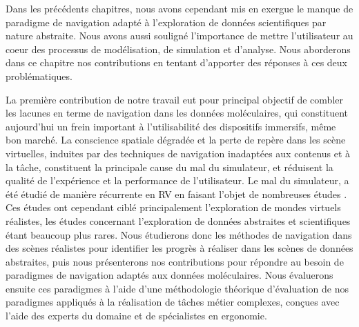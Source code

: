 
Dans les précédents chapitres, nous avons cependant mis en exergue le manque de paradigme de navigation adapté à l'exploration de données scientifiques par nature abstraite. Nous avons aussi souligné l'importance de mettre l'utilisateur au coeur des processus de modélisation, de simulation et d'analyse. Nous aborderons dans ce chapitre nos contributions en tentant d'apporter des réponses à ces deux problématiques.

La première contribution de notre travail eut pour principal objectif de combler les lacunes en terme de navigation dans les données moléculaires, qui constituent aujourd'hui un frein important à l'utilisabilité des dispositifs immersifs, même bon marché. La conscience spatiale dégradée et la perte de repère dans les scène virtuelles, induites par des techniques de navigation inadaptées aux contenus et à la tâche, constituent la principale cause du mal du simulateur, et réduisent la qualité de l'expérience et la performance de l'utilisateur. Le mal du simulateur, a été étudié de manière récurrente en RV en faisant l'objet de nombreuses études \cite{laviola_jr_discussion_2000,davis2014systematic}. Ces études ont cependant ciblé principalement l'exploration de mondes virtuels réalistes, les études concernant l'exploration de données abstraites et scientifiques étant beaucoup plus rares. Nous étudierons donc les méthodes de navigation dans des scènes réalistes pour identifier les progrès à réaliser dans les scènes de données abstraites, puis nous présenterons nos contributions pour répondre au besoin de paradigmes de navigation adaptés aux données moléculaires. Nous évaluerons ensuite ces paradigmes à l'aide d'une méthodologie théorique d'évaluation de nos paradigmes appliqués à la réalisation de tâches métier complexes, conçues avec l'aide des experts du domaine et de spécialistes en ergonomie.

